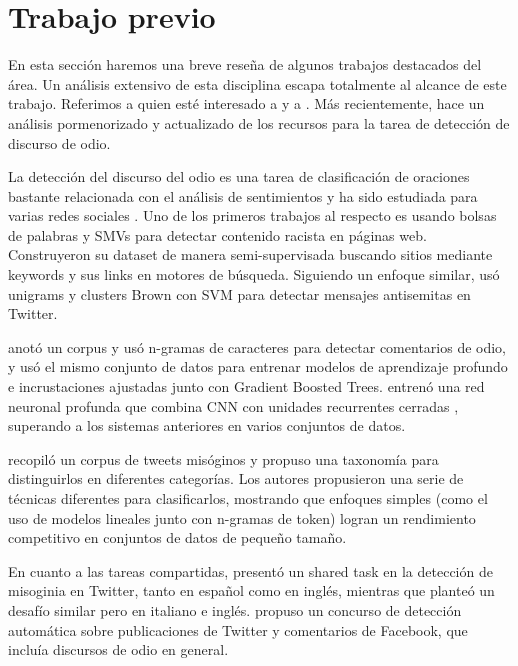 \section{Trabajo previo}

En esta sección haremos una breve reseña de algunos trabajos destacados del área. Un análisis extensivo de esta disciplina escapa totalmente al alcance de este trabajo. Referimos a quien esté interesado a \citet{schmidt2017survey} y a \citet{fortuna2018survey}. Más recientemente, \citet{poletto2021resources} hace un análisis pormenorizado y actualizado de los recursos para la tarea de detección de discurso de odio.

La detección del discurso del odio es una tarea de clasificación de oraciones bastante relacionada con el análisis de sentimientos y ha sido estudiada para varias redes sociales \cite{thelwall2008social, pak2010twitter, saleem2017web}. Uno de los primeros trabajos al respecto es \citet{greevy2004classifying} usando bolsas de palabras y SMVs para detectar contenido racista en páginas web. Construyeron su dataset de manera semi-supervisada buscando sitios mediante keywords y sus links en motores de búsqueda. Siguiendo un enfoque similar, \citet{warner2012detecting} usó unigrams y clusters Brown con SVM para detectar mensajes antisemitas en Twitter.

\citet{waseem2016hateful} anotó un corpus y usó n-gramas de caracteres para detectar comentarios de odio, y \citet{badjatiya2017deep} usó el mismo conjunto de datos para entrenar modelos de aprendizaje profundo e incrustaciones ajustadas junto con Gradient Boosted Trees. \citet {zhang2018detecting} entrenó una red neuronal profunda que combina CNN con unidades recurrentes cerradas \cite{cho2014learning}, superando a los sistemas anteriores en varios conjuntos de datos.

\citet{anzovino2018automatic} recopiló un corpus de tweets misóginos y propuso una taxonomía para distinguirlos en diferentes categorías. Los autores propusieron una serie de técnicas diferentes para clasificarlos, mostrando que enfoques simples (como el uso de modelos lineales junto con n-gramas de token) logran un rendimiento competitivo en conjuntos de datos de pequeño tamaño.

En cuanto a las tareas compartidas, \citet{fersini2018overview} presentó un shared task en la detección de misoginia en Twitter, tanto en español como en inglés, mientras que \citet{fersini2018evalitaoverview} planteó un desafío similar pero en italiano e inglés. \citet{bosco2018overview} propuso un concurso de detección automática sobre publicaciones de Twitter y comentarios de Facebook, que incluía discursos de odio en general.



